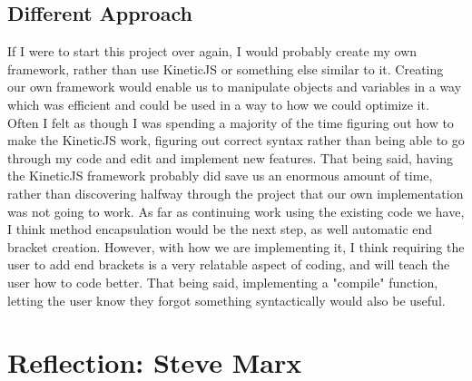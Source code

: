 \documentclass[a4paper]{article}
\begin{document}
\subsection{Different Approach}
	If I were to start this project over again, I would probably create my own framework, rather than use KineticJS or something else similar to it. Creating our own framework would enable us to manipulate objects and variables in a way which was efficient and could be used in a way to how we could optimize it. Often I felt as though I was spending a majority of the time figuring out how to make the KineticJS work, figuring out correct syntax rather than being able to go through my code and edit and implement new features. That being said, having the KineticJS framework probably did save us an enormous amount of time, rather than discovering halfway through the project that our own implementation was not going to work. As far as continuing work using the existing code we have, I think method encapsulation would be the next step, as well automatic end bracket creation. However, with how we are implementing it, I think requiring the user to add end brackets is a very relatable aspect of coding, and will teach the user how to code better. That being said, implementing a "compile" function, letting the user know they forgot something syntactically would also be useful.
	
	\section{Reflection: Steve Marx}
\end{document}
